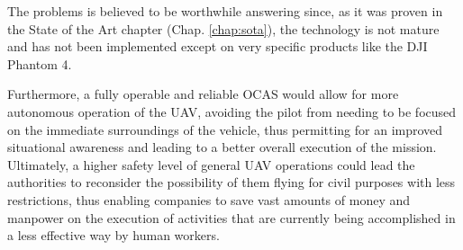 The problems is believed to be worthwhile answering since, as it was proven in the State of the Art chapter (Chap. \ref{chap:sota}), the technology is not mature and has not been implemented except on very specific products like the DJI Phantom 4.

Furthermore, a fully operable and reliable OCAS would allow for more autonomous operation of the UAV, avoiding the pilot from needing to be focused on the immediate surroundings of the vehicle, thus permitting for an improved situational awareness and leading to a better overall execution of the mission.
Ultimately, a higher safety level of general UAV operations could lead the authorities to reconsider the possibility of them flying for civil purposes with less restrictions, thus enabling companies to save vast amounts of money and manpower on the execution of activities that are currently being accomplished in a less effective way by human workers.


